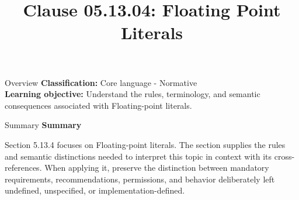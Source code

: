 \documentclass[10pt,letterpaper]{article}
\title{Clause 05.13.04: Floating Point Literals}
\author{}
\date{}
\begin{document}
\maketitle
\begin{CornellOverviewBox}{Overview}
\textbf{Classification:} Core language - Normative\\[2pt]
\textbf{Learning objective:} Understand the rules, terminology, and semantic consequences associated with Floating-point literals.
\end{CornellOverviewBox}\begin{CornellSummaryBox}{Summary}
{\sffamily\bfseries\color{Accent} Summary}\par\vspace{3pt}Section 5.13.4 focuses on Floating-point literals. The section supplies the rules and semantic distinctions needed to interpret this topic in context with its cross-references. When applying it, preserve the distinction between mandatory requirements, recommendations, permissions, and behavior deliberately left undefined, unspecified, or implementation-defined.
\end{CornellSummaryBox}
\end{document}
